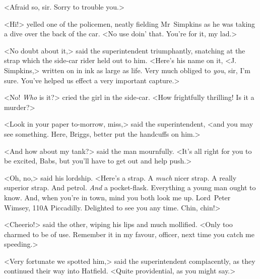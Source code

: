 <Afraid so, sir. Sorry to trouble you.>

<Hi!> yelled one of the policemen, neatly fielding Mr~Simpkins as he was taking a dive over the back of the car. <No use doin' that. You're for it, my lad.>

<No doubt about it,> said the superintendent triumphantly, snatching at the strap which the side-car rider held out to him. <Here's his name on it, <J\@. Simpkins,> written on in ink as large as life. Very much obliged to \textit{you}, sir, I'm sure. You've helped us effect a very important capture.>

<No! \textit{Who} is it?> cried the girl in the side-car. <How frightfully thrilling! Is it a murder?>

<Look in your paper to-morrow, miss,> said the superintendent, <and you may see something. Here, Briggs, better put the handcuffs on him.>

<And how about my tank?> said the man mournfully. <It's all right for you to be excited, Babs, but you'll have to get out and help push.>

<Oh, no,> said his lordship. <Here's a strap. A \textit{much} nicer strap. A really superior strap. And petrol. \textit{And} a pocket-flask. Everything a young man ought to know. And, when you're in town, mind you both look me up. Lord~Peter Wimsey, 110A Piccadilly. Delighted to see you any time. Chin, chin!>

<Cheerio!> said the other, wiping his lips and much mollified. <Only too charmed to be of use. Remember it in my favour, officer, next time you catch me speeding.>

<Very fortunate we spotted him,> said the superintendent complacently, as they continued their way into Hatfield. <Quite providential, as you might say.>

